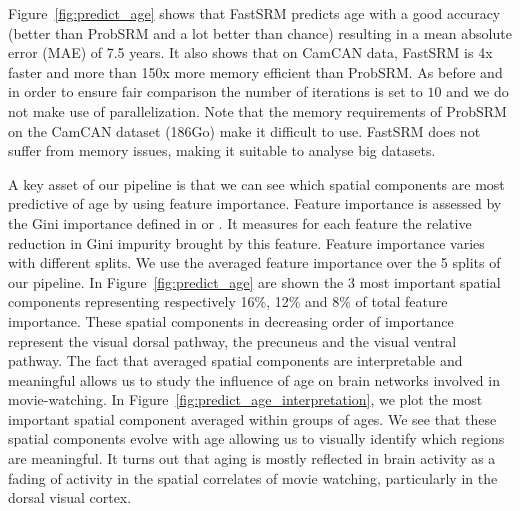 Figure~\ref{fig:predict_age} shows that FastSRM predicts age with a good accuracy (better than ProbSRM and a lot better than chance) resulting in a mean absolute error (MAE) of 7.5 years.
%
It also shows that on CamCAN data, FastSRM is 4x faster and more than 150x more memory efficient than ProbSRM. As before and in order to ensure fair comparison the number of iterations is set to $10$ and we do not make use of parallelization. Note that the memory requirements of ProbSRM on the CamCAN dataset (186Go) make it difficult to use.
%
FastSRM does not suffer from memory issues, making it suitable to analyse big datasets.

A key asset of our pipeline is that we can see which spatial components are most predictive of age by using feature importance.
%
Feature importance is assessed by the Gini importance defined in \cite{breiman2001random} or \cite{louppe2013understanding}.
%
It measures for each feature the relative reduction in Gini impurity brought by this feature.
%
Feature importance varies with different splits. We use the averaged feature importance over the 5 splits of our pipeline.
%
In Figure~\ref{fig:predict_age} are shown the 3 most important spatial components representing respectively 16\%, 12\% and 8\% of total feature importance.
%
These spatial components in decreasing order of importance represent the visual dorsal pathway, the precuneus and the visual ventral pathway. 
%
The fact that averaged spatial components are interpretable and meaningful allows us to study the influence of age on brain networks involved in movie-watching.
%
In Figure~\ref{fig:predict_age_interpretation}, we plot the most important spatial component averaged within groups of ages.
%
We see that these spatial components evolve with age allowing us to visually identify which regions are meaningful. 
%
It turns out that aging is mostly reflected in brain activity as a
fading of activity in the spatial correlates of movie watching,
particularly in the dorsal visual cortex.
%


